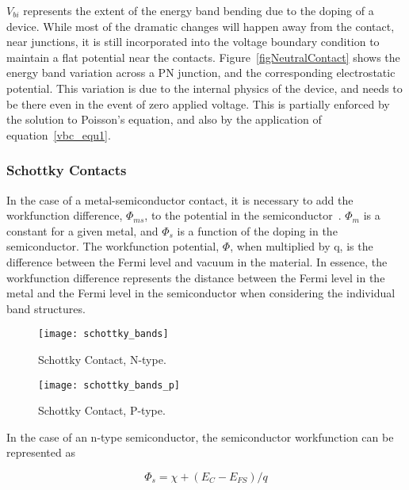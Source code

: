 $V_{bi}$ represents the extent of the energy band bending due to the doping
of a device.  While most of the dramatic changes will happen away from the
contact, near junctions, it is still incorporated into the voltage boundary
condition to maintain a flat potential near the contacts.  
Figure~\ref{figNeutralContact} shows the energy band variation across a PN
junction, and the corresponding electrostatic potential.  This variation is
due to the internal physics of the device, and needs to be there even in
the event of zero applied voltage.  This is partially enforced by the
solution to Poisson's equation, and also by the application of
equation~\ref{vbc_equ1}.


\subsubsection{Schottky Contacts}
In the case of a metal-semiconductor contact, it is necessary to add the
workfunction difference, $\Phi_{ms}$, to the potential in the
semiconductor~\cite{streetman}.  $\Phi_{m}$ is a constant for a given metal, and $\Phi_{s}$
is a function of the doping in the semiconductor.  The workfunction
potential, $\Phi$, when multiplied by q, is the difference between the
Fermi level and vacuum in the material.  In essence, the workfunction
difference represents the distance between the Fermi level in the metal and
the Fermi level in the semiconductor when considering the individual band
structures.

\begin{figure}[ht]
  \centering
  \scalebox{1.0}
  {\texttt{[image: schottky\_bands]}}
  \caption[Schottky Contact, N-type]{Schottky Contact, N-type. 
   \label{figSchottkyContactN}}
\end{figure}

\begin{figure}[ht]
  \centering
  \scalebox{1.0}
  {\texttt{[image: schottky\_bands\_p]}}
  \caption[Schottky Contact, P-type]{Schottky Contact, P-type. 
   \label{figSchottkyContactP}}
  
\end{figure}


In the case of an n-type semiconductor, the semiconductor workfunction can
be represented as

\begin{equation}
  \Phi_{s} = \chi + (E_{C}- E_{FS})/q
\end{equation}

